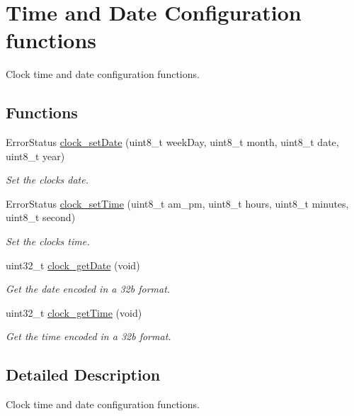 \hypertarget{group___time___date}{}\section{Time and Date Configuration functions}
\label{group___time___date}


Clock time and date configuration functions.  


\subsection*{Functions}
\begin{DoxyCompactItemize}
\item 
Error\+Status \hyperlink{group___time___date_gaf16498fa2702bfda6b89a3335ccc7ca6}{clock\+\_\+set\+Date} (uint8\+\_\+t week\+Day, uint8\+\_\+t month, uint8\+\_\+t date, uint8\+\_\+t year)
\begin{DoxyCompactList}\small\item\em Set the clock\textquotesingle{}s date. \end{DoxyCompactList}\item 
Error\+Status \hyperlink{group___time___date_ga11404197d58ddf6b46230bcde4282ef2}{clock\+\_\+set\+Time} (uint8\+\_\+t am\+\_\+pm, uint8\+\_\+t hours, uint8\+\_\+t minutes, uint8\+\_\+t second)
\begin{DoxyCompactList}\small\item\em Set the clock\textquotesingle{}s time. \end{DoxyCompactList}\item 
uint32\+\_\+t \hyperlink{group___time___date_gabb4d72928cb3d131d40067fb141003aa}{clock\+\_\+get\+Date} (void)
\begin{DoxyCompactList}\small\item\em Get the date encoded in a 32b format. \end{DoxyCompactList}\item 
uint32\+\_\+t \hyperlink{group___time___date_ga03ae6948083c259f6edc0b146f40dc62}{clock\+\_\+get\+Time} (void)
\begin{DoxyCompactList}\small\item\em Get the time encoded in a 32b format. \end{DoxyCompactList}\end{DoxyCompactItemize}


\subsection{Detailed Description}
Clock time and date configuration functions. 

